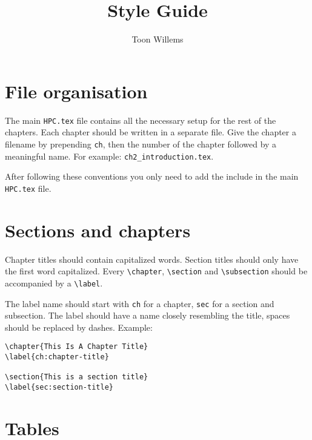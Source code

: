 \documentclass[11pt,a4paper]{article}
\title{Style Guide}
\author{Toon Willems}
\begin{document}
\maketitle

\section{File organisation}
\label{sec:file-organisation}

The main \texttt{HPC.tex} file contains all the necessary setup for the rest of
the chapters. Each chapter should be written in a separate file. Give the
chapter a filename by prepending \texttt{ch}, then the number of the chapter
followed by a meaningful name. For example: \texttt{ch2\_introduction.tex}.

After following these conventions you only need to add the include in the main
\texttt{HPC.tex} file.

\section{Sections and chapters}
\label{sec:sections-and-chapters}

Chapter titles should contain capitalized words. Section titles should only
have the first word capitalized. Every \texttt{\textbackslash{}chapter},
\texttt{\textbackslash{}section} and \texttt{\textbackslash{}subsection} should
be accompanied by a \texttt{\textbackslash{}label}.

The label name should start with \texttt{ch} for a chapter, \texttt{sec} for a
section and subsection. The label should have a name closely resembling the
title, spaces should be replaced by dashes. Example:

\begin{verbatim}
\chapter{This Is A Chapter Title}
\label{ch:chapter-title}

\section{This is a section title}
\label{sec:section-title}
\end{verbatim}

\section{Tables}
\label{sec:tables}
\end{document}
